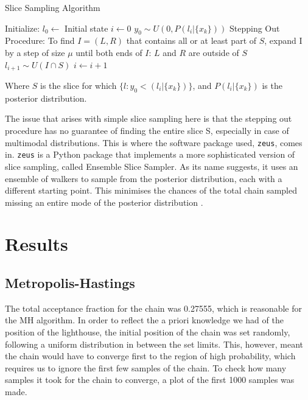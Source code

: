 \documentclass[12pt]{report} %
\begin{document}
\begin{definitionbox}{Slice Sampling Algorithm \cite{karamanis_zeus}}
\fontsize{8}{12}\selectfont
    \begin{algorithmic}[1]
        \State Initialize:
        \State \quad $l_0 \gets$ Initial state
        \State \quad $i \gets 0$
         
            \State $y_{0} \sim U(0, P(l_{i}|\{x_{k}\}))$
            \State Stepping Out Procedure: To find $I = (L, R)$ that contains all or at least part of $S$, expand I by a step of size $\mu$ until both ends of $I$: $L$ and $R$ are outside of $S$
            \State $l_{i+1} \sim U(I \cap S)$ 
            \State $i \gets i + 1$
        \EndWhile
    \end{algorithmic}
    Where $S$ is the slice for which $\{l: y_{0} < (l_{i}|\{x_{k}\})\}$, and $P(l_{i}|\{x_{k}\})$ is the posterior distribution.
\end{definitionbox}

\vspace*{1\baselineskip}
The issue that arises with simple slice sampling here is that the stepping out procedure has no guarantee of finding the entire slice S, especially in case of multimodal distributions. This is where the software package used, \texttt{zeus}, comes in. \texttt{zeus} is a Python package that implements a more sophisticated version of slice sampling, called Ensemble Slice Sampler. As its name suggests, it uses an ensemble of walkers to sample from the posterior distribution, each with a different starting point. This minimises the chances of the total chain sampled missing an entire mode of the posterior distribution \cite{karamanis_zeus}.


\section{Results}

\subsection{Metropolis-Hastings}


The total acceptance fraction for the chain was 0.27555, which is reasonable for the MH algorithm. In order to reflect the a priori knowledge we had of the position of the lighthouse, the initial position of the chain was set randomly, following a uniform distribution in between the set limits. This, however, meant the chain would have to converge first to the region of high probability, which requires us to ignore the first few samples of the chain. To check how many samples it took for the chain to converge, a plot of the first 1000 samples was made.
\end{document}
